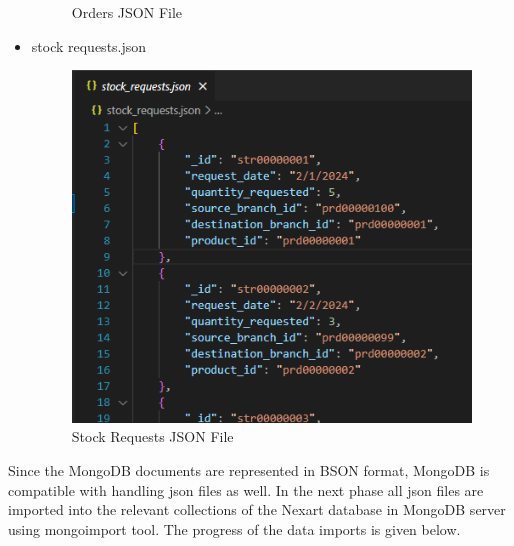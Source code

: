 \documentclass[a4Paper,12pt]{report}
\begin{document}
\begin{itemize}
\begin{figure}[H]
\caption{Orders JSON File}
\end{figure}
\item stock requests.json
\begin{figure}[H]
\centering
\includegraphics[scale=0.4]{images/stock_request_json.png}
\caption{Stock Requests JSON File}
\end{figure}
\end{itemize}
Since the MongoDB documents are represented in BSON format, MongoDB is compatible with handling json files as well. In the next phase all json files are imported into the relevant collections of the Nexart database in MongoDB server using mongoimport tool. The progress of the data imports is given below. 
\end{document}
